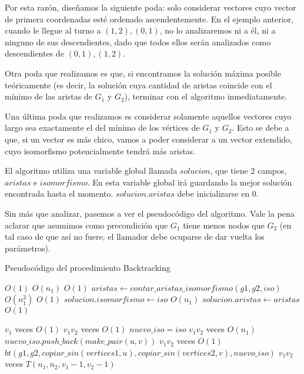 Por esta razón, diseñamos la siguiente poda: solo considerar vectores cuyo vector de primera coordenadas esté ordenado ascendentemente. En el ejemplo anterior, cuando le llegue al turno a ${(1,2), (0,1)}$, no lo analizaremos ni a él, ni a ninguno de sus descendientes, dado que todos ellos serán analizados como descendientes de ${(0,1), (1,2)}$.

Otra poda que realizamos es que, si encontramos la solución máxima posible teóricamente (es decir, la solución cuya cantidad de aristas coincide con el mínimo de las aristas de $G_1$ y $G_2$), terminar con el algoritmo inmediatamente.

Una última poda que realizamos es considerar solamente aquellos vectores cuyo largo sea exactamente el del mínimo de los vértices de $G_1$ y $G_2$. Esto se debe a que, si un vector es más chico, vamos a poder considerar a un vector extendido, cuyo isomorfismo potencialmente tendrá más aristas.

El algoritmo utiliza una variable global llamada $solucion$, que tiene 2 campos, $aristas$ e $isomorfismo$. En esta variable global irá guardando la mejor solución encontrada hasta el momento. $solucion.aristas$ debe inicializarse en 0.

Sin más que analizar, pasemos a ver el pseudocódigo del algoritmo. Vale la pena aclarar que asumimos como precondición que $G_1$ tiene menos nodos que $G_2$ (en tal caso de que así no fuere, el llamador debe ocuparse de dar vuelta los parámetros).


\begin{algorithm}[H]
  \begin{algorithmic}[1]
  \caption{Pseudocódigo del procedimiento Backtracking}
  \label{algo:2-1}
        \Comment $O(1)$ 
        \State \Return
      \EndIf
        \Comment $O(n_1)$ 
        \State \Return
      \EndIf
        \Comment $O(1)$ 
        \State $aristas \gets contar\_aristas\_isomorfismo(g1, g2, iso)$
        \Comment $O(n_1^2)$ 
          \Comment $O(1)$ 
          \State $solucion.isomorfismo \gets iso$
          \Comment $O(n_1)$ 
          \State $solucion.aristas \gets aristas$
          \Comment $O(1)$ 
        \EndIf
        \State \Return
      \EndIf
      
        \Comment $v_1$ veces $O(1)$ 
          \Comment $v_1 v_2$ veces $O(1)$ 
          \State $nuevo\_iso = iso$
          \Comment $v_1 v_2$ veces $O(n_1)$ 
          \State $nuevo\_iso.push\_back(make\_pair(u,v))$
          \Comment $v_1 v_2$ veces $O(1)$ 
          \State $bt(g1, g2, copiar\_sin(vertices1, u), copiar\_sin(vertices2, v), nuevo\_iso)$
          \Comment $v_1 v_2$ veces $T(n_1, n_2, v_1 - 1, v_2 - 1)$
        \EndFor
      \EndFor
		\EndProcedure
	\end{algorithmic}
\end{algorithm}



